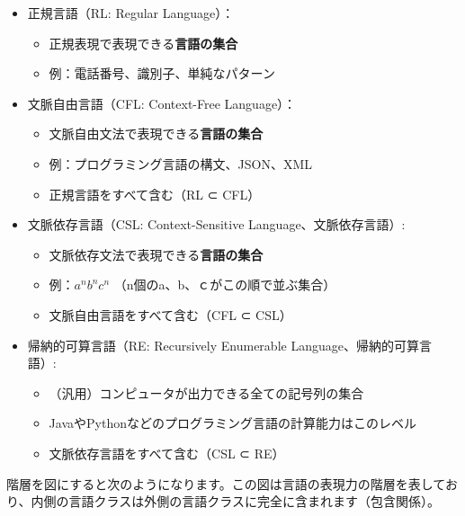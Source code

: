\begin{itemize}
\tightlist
\item
  正規言語（RL: Regular Language）：

  \begin{itemize}
  \tightlist
  \item
    正規表現で表現できる\textbf{言語の集合}
  \item
    例：電話番号、識別子、単純なパターン
  \end{itemize}
\item
  文脈自由言語（CFL: Context-Free Language）：

  \begin{itemize}
  \tightlist
  \item
    文脈自由文法で表現できる\textbf{言語の集合}
  \item
    例：プログラミング言語の構文、JSON、XML
  \item
    正規言語をすべて含む（RL ⊂ CFL）
  \end{itemize}
\item
  文脈依存言語（CSL: Context-Sensitive Language、文脈依存言語）:

  \begin{itemize}
  \tightlist
  \item
    文脈依存文法で表現できる\textbf{言語の集合}
  \item
    例：$a^nb^nc^n$ （n個のa、b、ｃがこの順で並ぶ集合）
  \item
    文脈自由言語をすべて含む（CFL ⊂ CSL）
  \end{itemize}
\item
  帰納的可算言語（RE: Recursively Enumerable Language、帰納的可算言語）:

  \begin{itemize}
  \tightlist
  \item
    （汎用）コンピュータが出力できる全ての記号列の集合
  \item
    JavaやPythonなどのプログラミング言語の計算能力はこのレベル
  \item
    文脈依存言語をすべて含む（CSL ⊂ RE）
  \end{itemize}
\end{itemize}

階層を図にすると次のようになります。この図は言語の表現力の階層を表しており、内側の言語クラスは外側の言語クラスに完全に含まれます（包含関係）。


